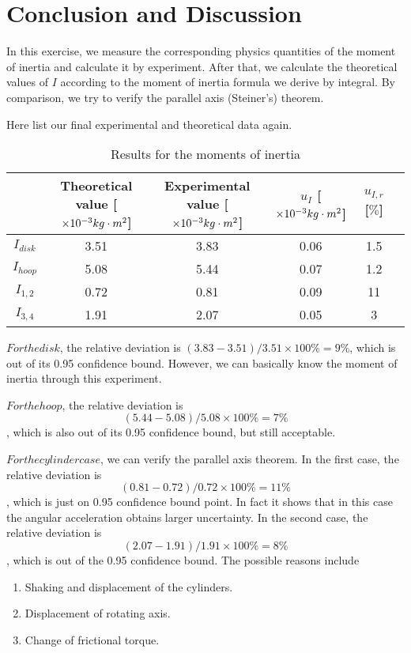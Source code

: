 \section{Conclusion and Discussion}
    In this exercise, we measure the corresponding physics quantities of the moment of inertia and calculate it by experiment. After that, we calculate the theoretical values of $I$ according to the moment of inertia formula we derive by integral. By comparison, we try to verify the parallel axis (Steiner's) theorem.

    Here list our final experimental and theoretical data again.
    
    \begin{table}[H] \small
        \centering
        \begin{tabular}{|c|c|c|c|c|c|}
            \hline
            & Theoretical value [$\times10^{-3}kg\cdot m^2$] & Experimental value [$\times10^{-3}kg\cdot m^2$] & $u_I$ [$\times10^{-3}kg\cdot m^2$] & $u_{I,r}$ [$\%$]\\\hline
            $I_{disk}$ & 3.51 & 3.83 & 0.06 & 1.5\\\hline
            $I_{hoop}$ & 5.08 & 5.44 & 0.07 & 1.2\\\hline
            $I_{1,2}$ & 0.72 & 0.81 & 0.09 & 11\\\hline
            $I_{3,4}$ & 1.91 & 2.07 & 0.05 & 3\\\hline
        \end{tabular}
        \caption{Results for the moments of inertia}\label{data_i}
    \end{table}
    
    $For the disk$, the relative deviation is $(3.83-3.51)/3.51\times100\%=9\%$, which is out of its 0.95 confidence bound. However, we can basically know the moment of inertia through this experiment.

    $For the hoop$, the relative deviation is $$(5.44-5.08)/5.08\times100\%=7\%$$, which is also out of its 0.95 confidence bound, but still acceptable.

    $For the cylinder case$, we can verify the parallel axis theorem. In the first case, the relative deviation is $$(0.81-0.72)/0.72\times100\%=11\%$$, which is just on 0.95 confidence bound point. In fact it shows that in this case the angular acceleration obtains larger uncertainty. In the second case, the relative deviation is $$(2.07-1.91)/1.91\times100\%=8\%$$, which is out of the 0.95 confidence bound. The possible reasons include
    \begin{enumerate}
        \item Shaking and displacement of the cylinders.
        \item Displacement of rotating axis.
        \item Change of frictional torque.
    \end{enumerate}

